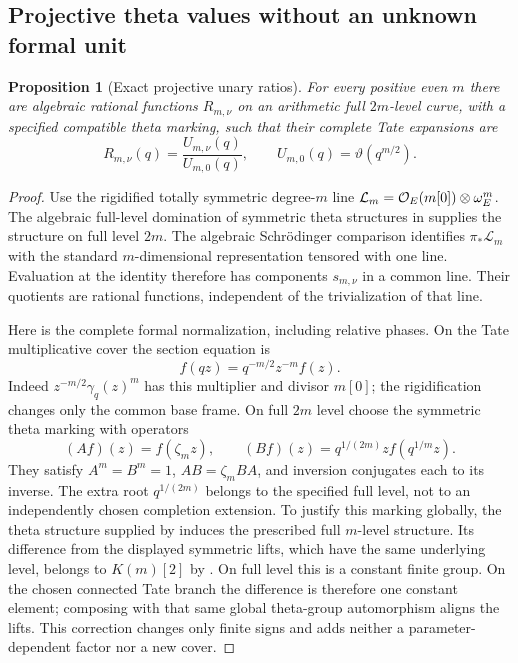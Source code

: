 \documentclass[11pt]{article}
\newtheorem{proposition}[theorem]{Proposition}
\theoremstyle{remark}\newtheorem{remark}[theorem]{Remark}
\begin{document}
\subsection{Projective theta values without an unknown formal unit}
\begin{proposition}[Exact projective unary ratios]\label{projective-ratios}
For every positive even $m$ there are algebraic rational functions
$R_{m,\nu}$ on an arithmetic full $2m$-level curve, with a specified
compatible theta marking, such that their complete Tate expansions are
\[
 R_{m,\nu}(q)=\frac{U_{m,\nu}(q)}{U_{m,0}(q)},
 \qquad U_{m,0}(q)=\vartheta(q^{m/2}).
\]
\end{proposition}
\begin{proof}
Use the rigidified totally symmetric degree-$m$ line
$\mathcal L_m=\mathcal O_E(m[0])\otimes\omega_E^m$.
The algebraic full-level domination of symmetric theta structures in
\cite[Remark 2.6.5]{candelori} supplies the structure on full level $2m$.
The algebraic Schr\"odinger comparison
\cite[Theorems 4.1.1 and 4.1.3]{candelori} identifies
$\pi_*\mathcal L_m$ with the standard $m$-dimensional representation
tensored with one line. Evaluation at the identity therefore has
components $s_{m,\nu}$ in a common line. Their quotients are rational
functions, independent of the trivialization of that line.

Here is the complete formal normalization, including relative phases.
On the Tate multiplicative cover the section equation is
\[
 f(qz)=q^{-m/2}z^{-m}f(z).
\]
Indeed $z^{-m/2}\gamma_q(z)^m$ has this multiplier and divisor $m[0]$;
the rigidification changes only the common base frame. On full $2m$
level choose the symmetric theta marking with operators
\[
 (Af)(z)=f(\zeta_m z),\qquad
 (Bf)(z)=q^{1/(2m)}z f(q^{1/m}z).
\]
They satisfy $A^m=B^m=1$, $AB=\zeta_m BA$, and inversion conjugates
each to its inverse. The extra root $q^{1/(2m)}$ belongs to the specified
full level, not to an independently chosen completion extension.
To justify this marking globally, the theta structure supplied by
\cite[Remark 2.6.5]{candelori} induces the prescribed full $m$-level
structure. Its difference from the displayed symmetric lifts, which
have the same underlying level, belongs to $K(m)[2]$ by
\cite[Lemma 2.5.3]{candelori}. On full level this is a constant finite
group. On the chosen connected Tate branch the difference is therefore
one constant element; composing with that same global theta-group
automorphism aligns the lifts. This correction changes only finite
signs and adds neither a parameter-dependent factor nor a new cover.


\end{proof}
\end{document}
